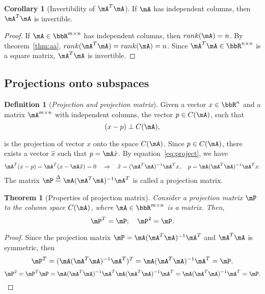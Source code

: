 \documentclass[11pt]{article}
\theoremstyle{plain}
\newtheorem{thm}{Theorem}[section]
\theoremstyle{definition}
\newtheorem{defn}{Definition}
\newtheorem{cor}{Corollary}
\begin{document}
\begin{cor}[Invertibility of $\mA^T \mA$]\label{cor:invert}
	If $\mA$ has independent columns, then $\mA^T \mA$ is invertible.
\end{cor}
\begin{proof}
	If $\mA \in \bbR^{m \times n}$ has independent columns, then $rank(\mA) = n$. By theorem~\ref{thm:aa}, $rank(\mA^T \mA) = rank(\mA) = n$. Since $\mA^T \mA \in \bbR^{n \times n}$ is a square matrix, $\mA^T \mA$ is invertible.
\end{proof}


\subsection{Projections onto subspaces}
\begin{defn}[\textit{Projection and projection matrix}]\label{def:project}
	Given a vector $x \in \bbR^{n}$ and a matrix $\mA^{m \times n}$ with independent columns, the vector $p \in C(\mA)$, such that
	\begin{equation}\label{eq:project}
		(x-p) \perp C(\mA),
	\end{equation} 
	
	is the projection of vector $x$ onto the space $C(\mA)$. Since $p \in C(\mA)$, there exists a vector $\hat x$ such that $p = \mA \hat x$. By equation~\eqref{eq:project}, we have
	\[ \mA^T (x - p) = \mA^T(x - \mA \hat x) = 0  \quad  \Rightarrow\quad  \hat x = (\mA^T \mA)^{-1} \mA^T x,\quad p = \mA(\mA^T \mA)^{-1} \mA^T x.  \] 
	The matrix $\mP \overset{\Delta}{=}   \mA(\mA^T \mA)^{-1} \mA^T$ is called a projection matrix.
\end{defn}

\begin{thm}[Properties of projection matrix]\label{thm:projectm}
	Consider a projection matrix $\mP$ to the column space $C(\mA)$, where $\mA \in \bbR^{m \times n}$ is a matrix. Then,
	\begin{equation}\label{eq:projectm}
		\mP^T = \mP;\quad  \mP^2 = \mP.
	\end{equation}
\end{thm}
\begin{proof}
	Since the projection matrix $\mP =   \mA(\mA^T \mA)^{-1} \mA^T$ and $\mA^T \mA$ is symmetric, then
	\[  \mP^T = (\mA(\mA^T \mA)^{-1} \mA^T )^T = \mA (\mA^T \mA)^{-1} \mA^T = \mP. \]
	\[  \mP^2 = \mP^T \mP =  \mA (\mA^T \mA)^{-1} \mA^T  \mA (\mA^T \mA)^{-1} \mA^T =  \mA (\mA^T \mA)^{-1} \mA^T = \mP. \]
\end{proof}
\end{document}
